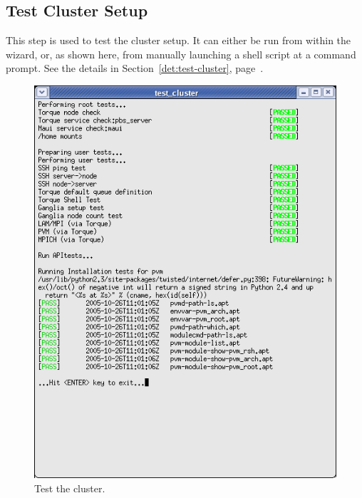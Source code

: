 
\subsection{Test Cluster Setup}

This step is used to test the cluster setup.  It can either be run
from within the wizard, or, as shown here, from manually launching a
shell script at a  command prompt.  See the details in
Section~\ref{det:test-cluster}, page~\pageref{det:test-cluster}.

\begin{figure}[!ht]
  \begin{center}
    \centerline{
      \includegraphics[scale=\imgscale]{figs/8_test-cluster-complete}
      }
    \caption{Test the cluster.}
    \label{fig:sbs-setup-test}
  \end{center}
\end{figure}


